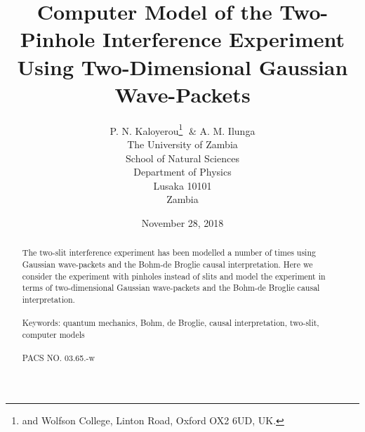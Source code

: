 \documentclass[12pt]{article}       %
\date{November 28, 2018}
\title{Computer Model of  the Two-Pinhole Interference Experiment Using Two-Dimensional Gaussian Wave-Packets}
\author{ P. N. Kaloyerou\footnote{ and Wolfson College, Linton Road, Oxford OX2 6UD, UK.}  $\;$\& A. M. Ilunga \\
The University of Zambia\\ School of Natural Sciences \\
Department of Physics \\ 
Lusaka 10101\\ 
 Zambia}
\begin{document}




\maketitle

\begin{abstract}

The two-slit interference experiment has been modelled a number of times using Gaussian wave-packets and the Bohm-de Broglie causal interpretation. Here we consider the experiment with pinholes instead of slits and model the experiment in terms of two-dimensional Gaussian wave-packets and the Bohm-de Broglie causal interpretation.\\ \mbox{}\\
Keywords: quantum mechanics, Bohm, de Broglie, causal interpretation,  two-slit, computer models\\ \mbox{}\\
PACS NO. 03.65.-w 
\end{abstract}


\end{document}
